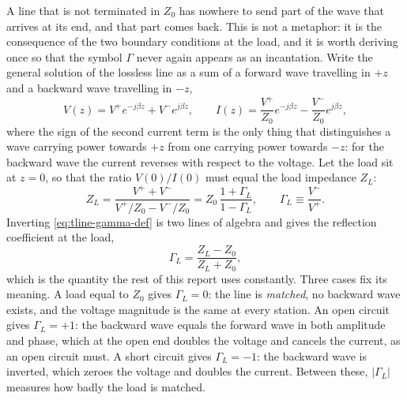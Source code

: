 A line that is not terminated in $Z_0$ has nowhere to send part of the wave that arrives at its end, and that
part comes back. This is not a metaphor: it is the consequence of the two boundary conditions at the load, and it
is worth deriving once so that the symbol $\Gamma$ never again appears as an incantation. Write the general
solution of the lossless line as a sum of a forward wave travelling in $+z$ and a backward wave travelling in
$-z$,
\begin{equation}
  V(z) = V^{+} e^{-j\beta z} + V^{-} e^{j\beta z}, \qquad
  I(z) = \frac{V^{+}}{Z_0} e^{-j\beta z} - \frac{V^{-}}{Z_0} e^{j\beta z},
  \label{eq:tline-two-waves}
\end{equation}
where the sign of the second current term is the only thing that distinguishes a wave carrying power towards
$+z$ from one carrying power towards $-z$: for the backward wave the current reverses with respect to the
voltage. Let the load sit at $z=0$, so that the ratio $V(0)/I(0)$ must equal the load impedance $Z_L$:
\begin{equation}
  Z_L = \frac{V^{+} + V^{-}}{V^{+}/Z_0 - V^{-}/Z_0}
      = Z_0\,\frac{1 + \Gamma_L}{1 - \Gamma_L},
  \qquad \Gamma_L \equiv \frac{V^{-}}{V^{+}} .
  \label{eq:tline-gamma-def}
\end{equation}
Inverting \eqref{eq:tline-gamma-def} is two lines of algebra and gives the reflection coefficient at the load,
\begin{equation}
  \Gamma_L = \frac{Z_L - Z_0}{Z_L + Z_0},
  \label{eq:tline-gamma}
\end{equation}
which is the quantity the rest of this report uses constantly. Three cases fix its meaning. A load equal to
$Z_0$ gives $\Gamma_L=0$: the line is \emph{matched}, no backward wave exists, and the voltage magnitude is the
same at every station. An open circuit gives $\Gamma_L=+1$: the backward wave equals the forward wave in both
amplitude and phase, which at the open end doubles the voltage and cancels the current, as an open circuit must.
A short circuit gives $\Gamma_L=-1$: the backward wave is inverted, which zeroes the voltage and doubles the
current. Between these, $|\Gamma_L|$ measures how badly the load is matched.

